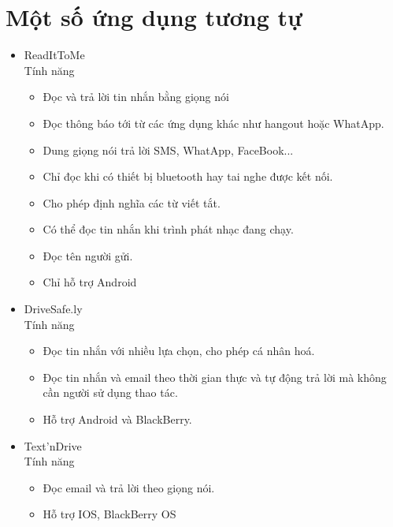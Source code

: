 \documentclass[a4paper,12pt,oneside]{article}
\begin{document}
\section{Một số ứng dụng tương tự}
	\begin{itemize}
		\item ReadItToMe \\
		Tính năng
			\begin{itemize}
				\item Đọc và trả lời tin nhắn bằng giọng nói
				\item Đọc thông báo tới từ các ứng dụng khác như hangout hoặc WhatApp.
				\item Dung giọng nói trả lời SMS, WhatApp, FaceBook...
				\item Chỉ đọc khi có thiết bị bluetooth hay tai nghe được kết nối.
				\item Cho phép định nghĩa các từ viết tắt.
				\item Có thể đọc tin nhắn khi trình phát nhạc đang chạy.
				\item Đọc tên người gửi.
				\item Chỉ hỗ trợ Android
			\end{itemize}
		\item DriveSafe.ly \\
		Tính năng
		\begin{itemize}
			\item Đọc tin nhắn với nhiều lựa chọn, cho phép cá nhân hoá.
			\item Đọc tin nhắn và email theo thời gian thực và tự động trả lời mà không cần người sử dụng thao tác.
			\item Hỗ trợ Android và BlackBerry.
		\end{itemize}
		\item Text'nDrive \\
		Tính năng 
			\begin{itemize}
				\item Đọc email và trả lời theo giọng nói.
				\item Hỗ trợ IOS, BlackBerry OS
			\end{itemize}
	\end{itemize}
\end{document}
